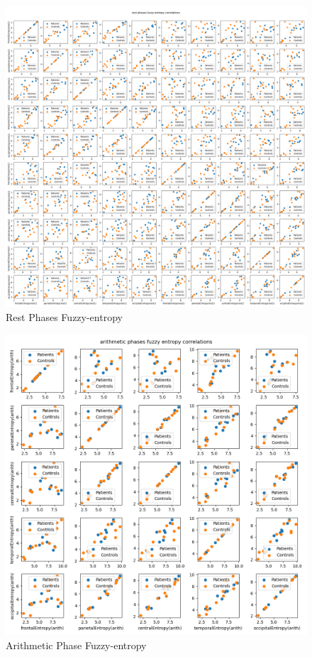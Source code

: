\documentclass[10pt]{article}
\begin{document}
\begin{figure}[H]
  \includegraphics[width=16cm]{../../../data_analysis_results/FuzzEnt/rest_phases_corr.png}
  \caption{Rest Phases Fuzzy-entropy}\label{rest_fuzz}
\end{figure}
\begin{figure}[H]
  \includegraphics[width=16cm]{../../../data_analysis_results/FuzzEnt/arith_phases_corr.png}
  \caption{Arithmetic Phase Fuzzy-entropy}\label{arith_fuzz}
\end{figure}
\end{document}
